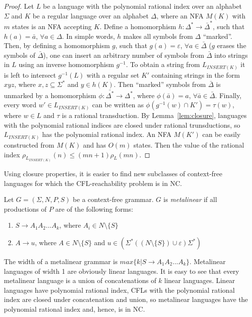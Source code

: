 \begin{proof}
 Let $L$ be a language with the polynomial rational index over an alphabet $\Sigma$ and $K$ be a regular language over an alphabet $\Delta$, where an NFA $M(K)$ with $m$ states is an NFA accepting $K$.  Define a homomorphism $h: \Delta^*  \rightarrow \bar{\Delta}^{*}$, such that $h(a)=\bar{a}$,  $\forall a \in \Delta$. In simple words, $h$ makes all symbols from $\Delta$ ``marked''. Then, by defining a homomorphism $g$, such that $g(a) = \varepsilon$, $\forall a \in \bar{\Delta}$ ($g$ erases the symbols of $\bar{\Delta}$), one can insert an arbitrary number of symbols from $\bar{\Delta}$ into strings in $L$ using an inverse homomorphism $g^{-1}$. To obtain a string from $L_{INSERT(K)}$ it is left to intersect $g^{-1}(L)$ with a regular set $K'$ containing strings in the form $xyz$, where $x, z \subseteq \Sigma^{*}$ and $y \in h(K)$. Then ``marked'' symbols from  $\bar{\Delta}$ is unmarked by a homomorphism $\phi:  \bar{\Delta^*}  \rightarrow \Delta^{*}$, where $\phi(\bar{a}) = a$, $\forall \bar{a} \in \bar{\Delta}$. Finally, every word $w' \in L_{INSERT(K)}$ can be written as $\phi(g^{-1}(w) \cap K') = \tau(w)$, where $w \in L$ and $\tau$ is a rational transduction. By Lemma~\ref{lem:closure}, languages with the polynomial rational indices are closed under rational trunsductions, so $L_{INSERT(K)}$ has the polynomial rational index. An NFA $M(K')$ can be easily constructed from $M(K)$ and has $O(m)$ states. Then the value of the rational index $\rho_{L_{INSERT(K)}}(n) \le (mn + 1)\rho_L(mn)$.
\end{proof}



Using closure properties, it is easier to find new subclasses of context-free languages for which the CFL-reachability problem is in NC.
\begin{example}
Let $G = (\Sigma, N, P, S)$ be a context-free grammar. $G$ is \textit{metalinear} if all productions of $P$ are of the following forms:
\begin{enumerate}
\item $S \rightarrow A_1A_2...A_k$, where $A_i \in N \setminus \{S\}$
\item $A \rightarrow u$, where $A \in N \setminus \{S\}$ and $u \in (\Sigma^*((N \setminus \{S\}) \cup {\varepsilon})\Sigma^*)$
\end{enumerate}


The width of a metalinear grammar is $max\{k\vert S \rightarrow A_1A_2...A_k \}$. Metalinear languages of width 1 are obviously linear languages. It is easy to see that every metalinear language is a union of concatenations of $k$ linear languages. Linear languages have polynomial rational index,  CFLs with the polynomial rational index are closed under concatenation and union, so metalinear languages have the polynomial rational index and, hence, is in NC.
\end{example}

